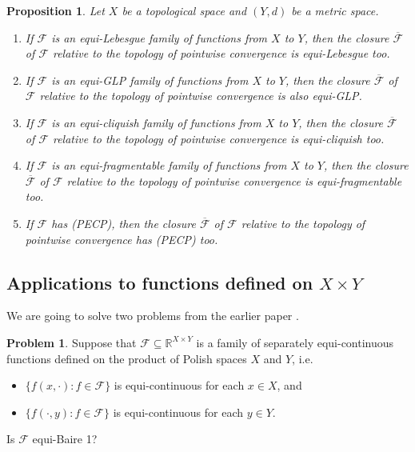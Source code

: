 \documentclass[a4paper]{amsart}
\theoremstyle{plain}
\newtheorem{proposition}[theorem]{Proposition}
\theoremstyle{definition}
\newtheorem{problem}[theorem]{Problem}
\theoremstyle{remark}
\numberwithin{equation}{section}
\begin{document}
\begin{proposition} Let $X$ be a topological space and $(Y,d)$ be a metric space.
\begin{enumerate}
\item
If $\mathcal F$ is an equi-Lebesgue  family of functions from $X$ to $Y$, then the closure $\overline{\mathcal F}$ of $\mathcal F$ relative to the topology of pointwise convergence is equi-Lebesgue  too.
\item
If $\mathcal F$ is an equi-GLP  family of functions from $X$ to $Y$, then the closure $\overline{\mathcal F}$ of $\mathcal F$ relative to the topology of pointwise convergence is also equi-GLP.
\item
If $\mathcal F$ is an equi-cliquish  family of functions from $X$ to $Y$, then the closure $\overline{\mathcal F}$ of $\mathcal F$ relative to the topology of pointwise convergence is equi-cliquish too.
\item
If $\mathcal F$ is an equi-fragmentable  family of functions from $X$ to $Y$, then the closure $\overline{\mathcal F}$ of $\mathcal F$ relative to the topology of pointwise convergence is equi-fragmentable  too.
\item
If $\mathcal F$  has (PECP), then the closure $\overline{\mathcal F}$ of $\mathcal F$ relative to the topology of pointwise convergence  has (PECP)  too.
\end{enumerate}
\end{proposition}

 
\subsection{Applications to functions defined on $X\times Y$}

We are going to solve two problems from the earlier paper \cite{BKS}.

\begin{problem}\cite[Prob.~3.7]{BKS}
Suppose that $\mathcal F\subseteq \mathbb{R}^{X\times Y}$ 
is a family of separately equi-continuous functions defined on the product of Polish spaces $X$ and $Y$, 
i.e.
\begin{itemize}
\item $\{f(x,\cdot)\colon f\in\mathcal F\}$ is equi-continuous for each $x\in X$, and 
\item $\{f(\cdot,y)\colon f\in\mathcal F\}$ is equi-continuous for each $y\in Y$.
\end{itemize}
Is $\mathcal F$ equi-Baire 1?
\end{problem}
\end{document}
